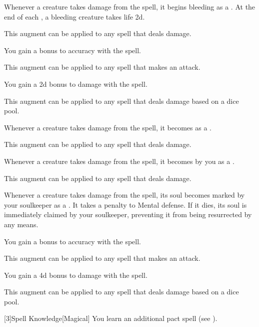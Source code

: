{            %
             Whenever a creature takes damage from the spell, it begins bleeding as a .
            At the end of each , a bleeding creature takes life  \minus2d.
            \par This augment can be applied to any spell that deals damage.

             You gain a  bonus to accuracy with the spell.
            \par This augment can be applied to any spell that makes an attack.

             You gain a \plus2d bonus to damage with the spell.
            \par This augment can be applied to any spell that deals damage based on a dice pool.

             Whenever a creature takes damage from the spell, it becomes  as a .
            \par This augment can be applied to any spell that deals damage.

             Whenever a creature takes damage from the spell, it becomes  by you as a .
            \par This augment can be applied to any spell that deals damage.

             Whenever a creature takes damage from the spell, its soul becomes marked by your soulkeeper as a .
            It takes a  penalty to Mental defense.
            If it dies, its soul is immediately claimed by your soulkeeper, preventing it from being resurrected by any means.

             You gain a  bonus to accuracy with the spell.
            \par This augment can be applied to any spell that makes an attack.

             You gain a \plus4d bonus to damage with the spell.
            \par This augment can be applied to any spell that deals damage based on a dice pool.
        }

        [3]{Spell Knowledge}[Magical]
        You learn an additional pact spell (see ).

